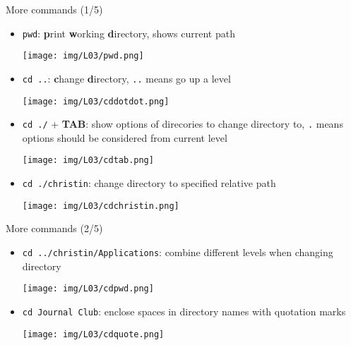 \documentclass[hyperref={pdfpagelabels=false},aspectratio=169]{beamer}
\begin{document}
\begin{frame}{More commands \small (1/5)}
    \begin{itemize}
        \item \texttt{pwd}: \textbf{p}rint \textbf{w}orking \textbf{d}irectory, shows current path
        
        \vspace{2pt}
        \texttt{[image: img/L03/pwd.png]}
    
        \item \texttt{cd ..}: \textbf{c}hange \textbf{d}irectory, \texttt{\textcolor{THorange}{..}} means go up a level
    
        \vspace{2pt}
        \texttt{[image: img/L03/cddotdot.png]}
        
        \item \texttt{cd ./} + \textbf{TAB}: show options of direcories to change directory to, \texttt{\textcolor{THorange}{.}} means options should be considered from current level
        
        \vspace{2pt}
        \texttt{[image: img/L03/cdtab.png]}
    
        \item \texttt{cd ./christin}: change directory to specified relative path
        
        \vspace{2pt}
        \texttt{[image: img/L03/cdchristin.png]}
    \end{itemize}
    
\end{frame}



\begin{frame}{More commands \small (2/5)}

    \begin{itemize}
        \item \texttt{cd ../christin/Applications}: combine different levels when changing directory
        
        \vspace{2pt}
        \texttt{[image: img/L03/cdpwd.png]}

        \item \texttt{cd \grqq Journal Club\grqq}: enclose spaces in directory names with quotation marks
        
        \vspace{2pt}
        \texttt{[image: img/L03/cdquote.png]}

    \end{itemize}
    
\end{frame}
\end{document}

